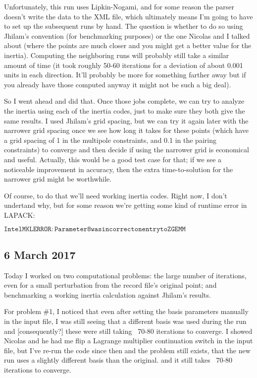 \documentclass[]{report}
\begin{document}
Unfortunately, this run uses Lipkin-Nogami, and for some reason the parser doesn't write the data to the XML file, which ultimately means I'm going to have to set up the subsequent runs by hand. The question is whether to do so using Jhilam's convention (for benchmarking purposes) or the one Nicolas and I talked about (where the points are much closer and you might get a better value for the inertia). Computing the neighboring runs will probably still take a similar amount of time (it took roughly 50-60 iterations for a deviation of about 0.001 units in each direction. It'll probably be more for something farther away but if you already have those computed anyway it might not be such a big deal).

So I went ahead and did that. Once those jobs complete, we can try to analyze the inertia using each of the inertia codes, just to make sure they both give the same results. I used Jhilam's grid spacing, but we can try it again later with the narrower grid spacing once we see how long it takes for these points (which have a grid spacing of 1 in the multipole constraints, and 0.1 in the pairing constraints) to converge and then decide if using the narrower grid is economical and useful. Actually, this would be a good test case for that; if we see a noticeable improvement in accuracy, then the extra time-to-solution for the narrower grid might be worthwhile.

Of course, to do that we'll need working inertia codes. Right now, I don't undertand why, but for some reason we're getting some kind of runtime error in LAPACK:

$\mathtt{Intel MKL ERROR: Parameter 8 was incorrect on entry to ZGEMM}$

\subsection*{6 March 2017}
Today I worked on two computational problems: the large number of iterations, even for a small perturbation from the record file's original point; and benchmarking a working inertia calculation against Jhilam's results.

For problem \#1, I noticed that even after setting the basis parameters manually in the input file, I was still seeing that a different basis was used during the run and [consequently?] these were still taking ~70-80 iterations to converge. I showed Nicolas and he had me flip a Lagrange multiplier continuation switch in the input file, but I've re-run the code since then and the problem still exists, that the new run uses a slightly different basis than the original. and it still takes ~70-80 iterations to converge.
\end{document}
